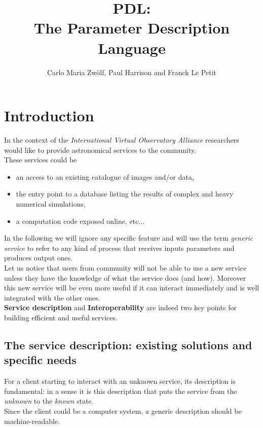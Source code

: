 \documentclass[a4paper,11pt] {article}
\title{PDL:  \\ The Parameter Description Language}
\author{Carlo Maria Zw\"olf, Paul Harrison and Franck Le Petit}
\begin{document}
\maketitle

\tableofcontents

\newpage

\section{Introduction}

In the context of the {\it International Virtual Observatory Alliance} researchers would like to
provide astronomical services to the community. \\
These services could be
\begin{itemize}
\item  an access to an existing catalogue of images and/or data,
\item  the entry point to a database listing the results of complex  and heavy numerical simulations,
\item a computation code exposed online, etc... 
\end{itemize}
In the following we will ignore any specific feature and will use the term {\it generic service} to
refer to any kind of process that receives inputs parameters and produces output ones.\\

Let us notice that users from community will not be able to use a new service unless they have the
knowledge of what the service does (and how).
Moreover this new service will be even more useful if it can interact immediately and is well
integrated with the other ones.\\

{\bf Service description} and {\bf Interoperability} are indeed two key points for building
efficient and useful services.

\subsection{The service description: existing solutions and specific needs}
For a client starting to interact with an unknown service, its description is fundamental: in a
sense it is this description that puts the service from the {\it unknown} to the {\it known}
state.\\
Since the client could be a computer system, a generic description should be machine-readable.\\
\end{document}
